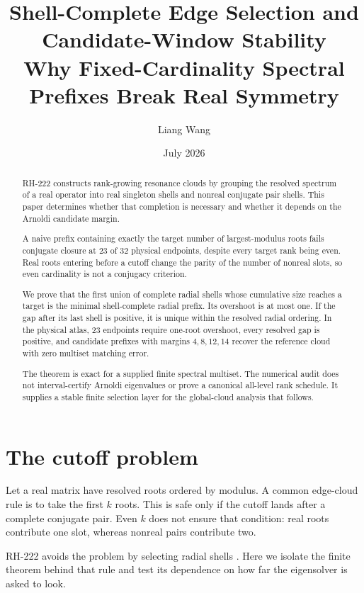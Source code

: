 \documentclass[11pt]{article}
\title{Shell-Complete Edge Selection and Candidate-Window Stability\\
\large Why Fixed-Cardinality Spectral Prefixes Break Real Symmetry}
\author{Liang Wang}
\date{July 2026}
\theoremstyle{remark}\newtheorem{remark}[theorem]{Remark}
\begin{document}
\maketitle

\begin{abstract}
RH-222 constructs rank-growing resonance clouds by grouping the resolved
spectrum of a real operator into real singleton shells and nonreal conjugate
pair shells. This paper determines whether that completion is necessary and
whether it depends on the Arnoldi candidate margin.

A naive prefix containing exactly the target number of largest-modulus roots
fails conjugate closure at 23 of 32 physical endpoints, despite every target
rank being even. Real roots entering before a cutoff change the parity of the
number of nonreal slots, so even cardinality is not a conjugacy criterion.

We prove that the first union of complete radial shells whose cumulative size
reaches a target is the minimal shell-complete radial prefix. Its overshoot is
at most one. If the gap after its last shell is positive, it is unique within
the resolved radial ordering. In the physical atlas, 23 endpoints require
one-root overshoot, every resolved gap is positive, and candidate prefixes
with margins $4,8,12,14$ recover the reference cloud with zero multiset
matching error.

The theorem is exact for a supplied finite spectral multiset. The numerical
audit does not interval-certify Arnoldi eigenvalues or prove a canonical
all-level rank schedule. It supplies a stable finite selection layer for the
global-cloud analysis that follows.
\end{abstract}

\section{The cutoff problem}

Let a real matrix have resolved roots ordered by modulus. A common edge-cloud
rule is to take the first $k$ roots. This is safe only if the cutoff lands
after a complete conjugate pair. Even $k$ does not ensure that condition:
real roots contribute one slot, whereas nonreal pairs contribute two.

RH-222 avoids the problem by selecting radial shells
\citep{WangRH222}. Here we isolate the finite theorem behind that rule and
test its dependence on how far the eigensolver is asked to look.
\end{document}
